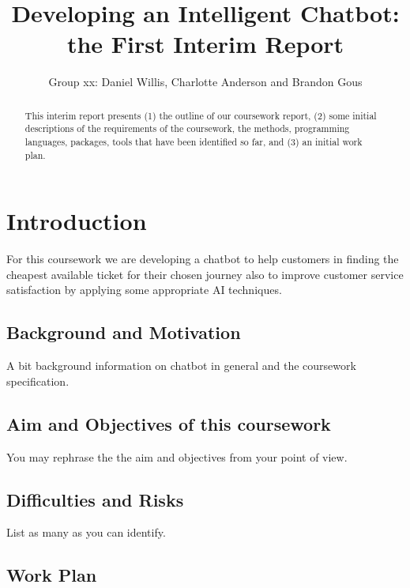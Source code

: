 \documentclass[11pt]{article}
\title{Developing an Intelligent Chatbot: the First Interim Report}
\author{Group xx: Daniel Willis, Charlotte Anderson and Brandon Gous}
\begin{document}
	
	\maketitle	
	\begin{abstract}
		This interim report presents (1) the outline of our coursework report, (2) some initial descriptions of the requirements of the coursework, the methods, programming languages, packages, tools that have been identified so far, and (3) an initial work plan.
	\end{abstract}
	
	\section{Introduction}
	
	
	For this coursework we are developing a chatbot to help customers in finding the cheapest available ticket for their chosen journey also to improve customer service satisfaction by applying some appropriate AI techniques.
	
	\subsection{Background and Motivation}
	A bit background information on chatbot in general and the coursework specification\citep{AI2018CW}.
	
	\subsection{Aim and Objectives of this coursework} 
	You may rephrase the the aim and objectives from your point of view.  
	
	\subsection{Difficulties and Risks}
	
	List as many as you can identify. 
	
	\subsection{Work Plan}	
	
\end{document}
